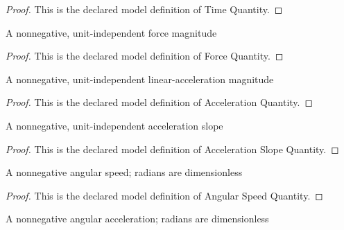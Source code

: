 \begin{proof}
  This is the declared model definition of Time Quantity.
\end{proof}
\begin{definition}
  \label{def:physics:phyx-mini-0772:phyxminiproblems-problemphyxmini0772-forcequantity}
  A nonnegative, unit-independent force magnitude
\end{definition}
\begin{proof}
  This is the declared model definition of Force Quantity.
\end{proof}
\begin{definition}
  \label{def:physics:phyx-mini-0772:phyxminiproblems-problemphyxmini0772-accelerationquantity}
  A nonnegative, unit-independent linear-acceleration magnitude
\end{definition}
\begin{proof}
  This is the declared model definition of Acceleration Quantity.
\end{proof}
\begin{definition}
  \label{def:physics:phyx-mini-0772:phyxminiproblems-problemphyxmini0772-accelerationslopequantity}
  A nonnegative, unit-independent acceleration slope
\end{definition}
\begin{proof}
  This is the declared model definition of Acceleration Slope Quantity.
\end{proof}
\begin{definition}
  \label{def:physics:phyx-mini-0772:phyxminiproblems-problemphyxmini0772-angularspeedquantity}
  A nonnegative angular speed; radians are dimensionless
\end{definition}
\begin{proof}
  This is the declared model definition of Angular Speed Quantity.
\end{proof}
\begin{definition}
  \label{def:physics:phyx-mini-0772:phyxminiproblems-problemphyxmini0772-angularaccelerationquantity}
  A nonnegative angular acceleration; radians are dimensionless
\end{definition}
